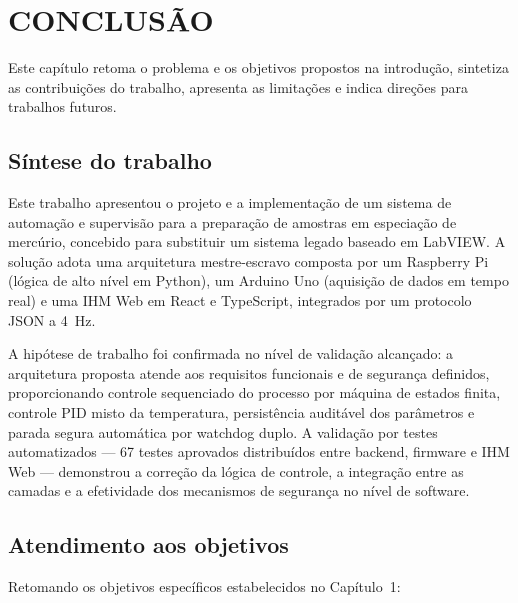 \chapter{CONCLUSÃO}

Este capítulo retoma o problema e os objetivos propostos na introdução, sintetiza
as contribuições do trabalho, apresenta as limitações e indica direções para
trabalhos futuros.

\section{Síntese do trabalho}

Este trabalho apresentou o projeto e a implementação de um sistema de automação
e supervisão para a preparação de amostras em especiação de mercúrio, concebido
para substituir um sistema legado baseado em LabVIEW. A solução adota uma
arquitetura mestre-escravo composta por um Raspberry Pi (lógica de alto nível em
Python), um Arduino Uno (aquisição de dados em tempo real) e uma IHM Web em
React e TypeScript, integrados por um protocolo JSON a 4~Hz.

A hipótese de trabalho foi confirmada no nível de validação alcançado: a
arquitetura proposta atende aos requisitos funcionais e de segurança definidos,
proporcionando controle sequenciado do processo por máquina de estados finita,
controle PID misto da temperatura, persistência auditável dos parâmetros e
parada segura automática por watchdog duplo. A validação por testes
automatizados --- 67 testes aprovados distribuídos entre backend, firmware e IHM
Web --- demonstrou a correção da lógica de controle, a integração entre as
camadas e a efetividade dos mecanismos de segurança no nível de software.

\section{Atendimento aos objetivos}

Retomando os objetivos específicos estabelecidos no Capítulo~1:

